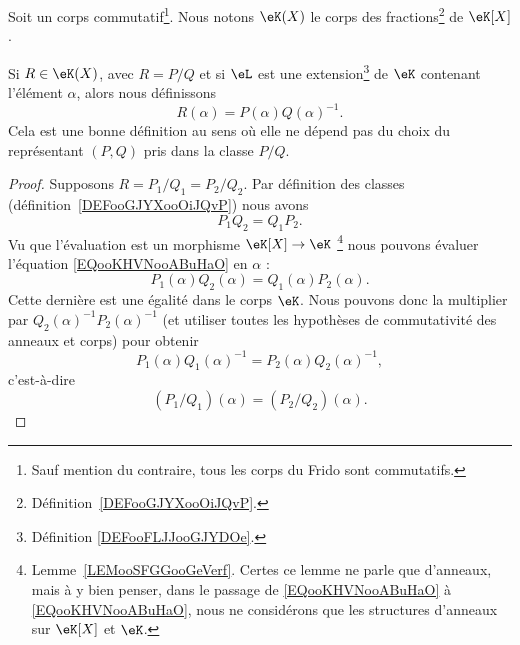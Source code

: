 \begin{definition}  \label{DEFooQPZIooQYiNVh}
    Soit un corps commutatif\footnote{Sauf mention du contraire, tous les corps du Frido sont commutatifs.}. Nous notons \( \eK(X)\) le corps des fractions\footnote{Définition~\ref{DEFooGJYXooOiJQvP}.} de \( \eK[X]\).
\end{definition}

\begin{lemmaDef}        \label{DEFooZHBZooKlNfGZ}
    Si \( R\in \eK(X)\), avec \( R=P/Q\) et si \( \eL\) est une extension\footnote{Définition \ref{DEFooFLJJooGJYDOe}.} de \( \eK\) contenant l'élément \( \alpha\), alors nous définissons
    \begin{equation}
        R(\alpha)=P(\alpha)Q(\alpha)^{-1}.
    \end{equation}
    Cela est une bonne définition au sens où elle ne dépend pas du choix du représentant \( (P,Q)\) pris dans la classe \( P/Q\).
\end{lemmaDef}

\begin{proof}
    Supposons \( R=P_1/Q_1=P_2/Q_2\). Par définition des classes (définition~\ref{DEFooGJYXooOiJQvP}) nous avons
    \begin{equation}        \label{EQooKHVNooABuHaO}
        P_1Q_2=Q_1P_2.
    \end{equation}
    Vu que l'évaluation est un morphisme \( \eK[X]\to\eK\) \footnote{Lemme~\ref{LEMooSFGGooGeVerf}. Certes ce lemme ne parle que d'anneaux, mais à y bien penser, dans le passage de \eqref{EQooKHVNooABuHaO} à \eqref{EQooKHVNooABuHaO}, nous ne considérons que les structures d'anneaux sur \( \eK[X]\) et \( \eK\).} nous pouvons évaluer l'équation \eqref{EQooKHVNooABuHaO} en \( \alpha\) :
    \begin{equation}        \label{EQooJAIGooRADgiD}
        P_1(\alpha)Q_2(\alpha)=Q_1(\alpha)P_2(\alpha).
    \end{equation}
    Cette dernière est une égalité dans le corps \( \eK\). Nous pouvons donc la multiplier par \( Q_2(\alpha)^{-1}P_2(\alpha)^{-1}\) (et utiliser toutes les hypothèses de commutativité des anneaux et corps) pour obtenir
    \begin{equation}
        P_1(\alpha)Q_1(\alpha)^{-1}=P_2(\alpha)Q_2(\alpha)^{-1},
    \end{equation}
    c'est-à-dire
    \begin{equation}
        (P_1/Q_1)(\alpha)=(P_2/Q_2)(\alpha).
    \end{equation}
\end{proof}

